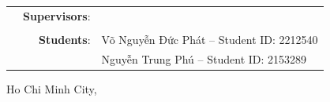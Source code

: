 \begin{titlepage}
\begin{table}[h]
\begin{tabular}{r r l}
& \Large \textbf{Supervisors}: & \Large \Lecturer{}\\
&              & \Large \Lecturern{}\\

& \Large \textbf{Students}: & \Large Võ Nguyễn Đức Phát -- Student ID: 2212540 \\
& & \Large Nguyễn Trung Phú -- Student ID: 2153289 \\

\end{tabular}
\end{table}

\vspace{2cm}

\begin{center}
{\large  Ho Chi Minh City, \SubmitTime{}}
\end{center}

\end{titlepage}





